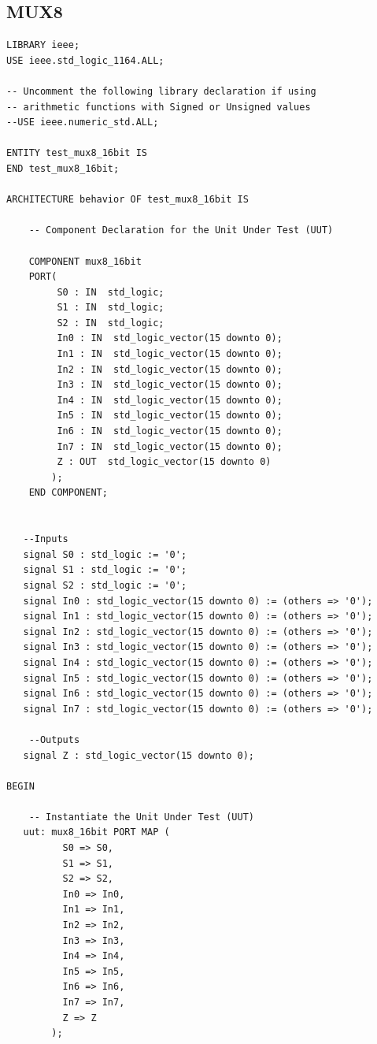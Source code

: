 \documentclass{article}
\begin{document}
\subsection{MUX8}\label{sec:result}

\begin{lstlisting}
LIBRARY ieee;
USE ieee.std_logic_1164.ALL;
 
-- Uncomment the following library declaration if using
-- arithmetic functions with Signed or Unsigned values
--USE ieee.numeric_std.ALL;
 
ENTITY test_mux8_16bit IS
END test_mux8_16bit;
 
ARCHITECTURE behavior OF test_mux8_16bit IS 
 
    -- Component Declaration for the Unit Under Test (UUT)
 
    COMPONENT mux8_16bit
    PORT(
         S0 : IN  std_logic;
         S1 : IN  std_logic;
         S2 : IN  std_logic;
         In0 : IN  std_logic_vector(15 downto 0);
         In1 : IN  std_logic_vector(15 downto 0);
         In2 : IN  std_logic_vector(15 downto 0);
         In3 : IN  std_logic_vector(15 downto 0);
         In4 : IN  std_logic_vector(15 downto 0);
         In5 : IN  std_logic_vector(15 downto 0);
         In6 : IN  std_logic_vector(15 downto 0);
         In7 : IN  std_logic_vector(15 downto 0);
         Z : OUT  std_logic_vector(15 downto 0)
        );
    END COMPONENT;
    

   --Inputs
   signal S0 : std_logic := '0';
   signal S1 : std_logic := '0';
   signal S2 : std_logic := '0';
   signal In0 : std_logic_vector(15 downto 0) := (others => '0');
   signal In1 : std_logic_vector(15 downto 0) := (others => '0');
   signal In2 : std_logic_vector(15 downto 0) := (others => '0');
   signal In3 : std_logic_vector(15 downto 0) := (others => '0');
   signal In4 : std_logic_vector(15 downto 0) := (others => '0');
   signal In5 : std_logic_vector(15 downto 0) := (others => '0');
   signal In6 : std_logic_vector(15 downto 0) := (others => '0');
   signal In7 : std_logic_vector(15 downto 0) := (others => '0');

 	--Outputs
   signal Z : std_logic_vector(15 downto 0);
  
BEGIN
 
	-- Instantiate the Unit Under Test (UUT)
   uut: mux8_16bit PORT MAP (
          S0 => S0,
          S1 => S1,
          S2 => S2,
          In0 => In0,
          In1 => In1,
          In2 => In2,
          In3 => In3,
          In4 => In4,
          In5 => In5,
          In6 => In6,
          In7 => In7,
          Z => Z
        );


\end{lstlisting}
\end{document}
